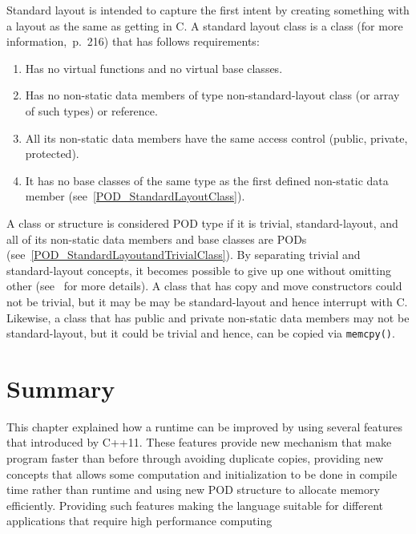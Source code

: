 \documentclass[11pt]{report}
\begin{document}
Standard layout is intended to capture the first intent by creating something with a layout as the same as getting in C. A standard layout class is a class (for more information\cite{ISO:2011:Cpplanguage},~p.~216) that has follows requirements:

\begin{enumerate}
\item	Has no virtual functions and no virtual base classes.
\item	Has no non-static data members of type non-standard-layout class (or array of such types) or reference.
\item	All its non-static data members have the same access control (public, private, protected).
\item	It has no base classes of the same type as the first defined non-static data member (see~\ref{POD_StandardLayoutClass}).
\end{enumerate}
A class or structure is considered POD type if it is trivial, standard-layout, and all of its non-static data members and base classes are PODs (see~\ref{POD_StandardLayoutandTrivialClass}). By separating trivial and standard-layout concepts, it becomes possible to give up one without omitting other (see~\cite{Stroustrup:2012:Cpp11} for more details). A class that has copy  and move constructors could not be trivial, but it may be may be standard-layout and hence interrupt with C. Likewise, a class that has  public and private non-static data members may not be standard-layout, but it could be trivial and hence, can be copied via \texttt{memcpy()}.

\section{Summary}
\label{sec: Summary}
This chapter explained how a runtime can be improved by using several features that introduced by C++11.  These features provide new mechanism that make program faster than before through avoiding duplicate copies, providing new concepts that allows some computation and initialization to be done in compile time rather than runtime and using new POD structure to allocate memory efficiently. Providing such features making the language suitable for different applications that require high performance computing

\end{document}
